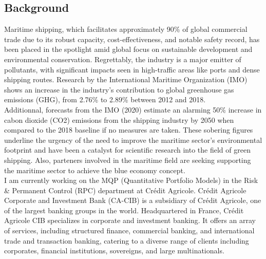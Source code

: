 \documentclass[a4paper,12pt]{article}
\begin{document}
\subsection{Background}
Maritime shipping, which facilitates approximately 90\% of global commercial trade due to its robust capacity, cost-effectiveness, and notable safety record, has been placed in the spotlight amid global focus on sustainable development and environmental conservation.
Regrettably, the industry is a major emitter of pollutants, with significant impacts seen in high-traffic areas like ports and dense shipping routes.
Research by the International Maritime Organization (IMO) shows an increase in the industry's contribution to global greenhouse gas emissions (GHG), from 2.76\% to 2.89\% between 2012 and 2018.\\

Additionnal, forecasts from the IMO (2020) estimate an alarming 50\% increase in cabon dioxide (CO2) emissions from the shipping industry by 2050 when compared to the 2018 baseline if no measures are taken.
These sobering figures underline the urgency of the need to improve the maritime sector's environmental footprint and have been a catalyst for scientific research into the field of green shipping. Also, parteners involved in the maritime field are seeking supporting the maritime sector to achieve the blue economy concept.\\

I am currently working on the MQP (Quantitative Portfolio Models) in the Risk \& Permanent Control (RPC) department at Crédit Agricole.
Crédit Agricole Corporate and Investment Bank (CA-CIB) is a subsidiary of Crédit Agricole, one of the largest banking groups in the world.
Headquartered in France, Crédit Agricole CIB specializes in corporate and investment banking.
It offers an array of services, including structured finance, commercial banking, and international trade and transaction banking, catering to a diverse range of clients including corporates, financial institutions, sovereigns, and large multinationals.\\
\end{document}
